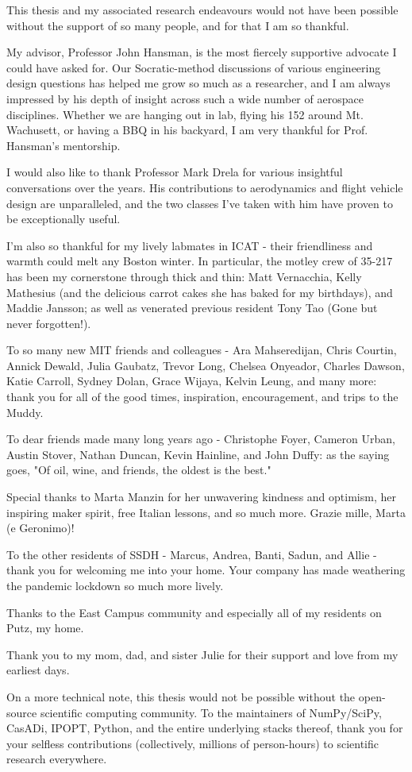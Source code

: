 This thesis and my associated research endeavours would not have been possible without the support of so many people, and for that I am so thankful.

My advisor, Professor John Hansman, is the most fiercely supportive advocate I could have asked for. Our Socratic-method discussions of various engineering design questions has helped me grow so much as a researcher, and I am always impressed by his depth of insight across such a wide number of aerospace disciplines. Whether we are hanging out in lab, flying his 152 around Mt. Wachusett, or having a BBQ in his backyard, I am very thankful for Prof. Hansman's mentorship.

I would also like to thank Professor Mark Drela for various insightful conversations over the years. His contributions to aerodynamics and flight vehicle design are unparalleled, and the two classes I've taken with him have proven to be exceptionally useful.

I'm also so thankful for my lively labmates in ICAT - their friendliness and warmth could melt any Boston winter. In particular, the motley crew of 35-217 has been my cornerstone through thick and thin: Matt Vernacchia, Kelly Mathesius (and the delicious carrot cakes she has baked for my birthdays), and Maddie Jansson; as well as venerated previous resident Tony Tao (Gone but never forgotten!).

To so many new MIT friends and colleagues - Ara Mahseredijan, Chris Courtin, Annick Dewald, Julia Gaubatz, Trevor Long, Chelsea Onyeador, Charles Dawson, Katie Carroll, Sydney Dolan, Grace Wijaya, Kelvin Leung, and many more: thank you for all of the good times, inspiration, encouragement, and trips to the Muddy.

To dear friends made many long years ago - Christophe Foyer, Cameron Urban, Austin Stover, Nathan Duncan, Kevin Hainline, and John Duffy: as the saying goes, "Of oil, wine, and friends, the oldest is the best."

Special thanks to Marta Manzin for her unwavering kindness and optimism, her inspiring maker spirit, free Italian lessons, and so much more. Grazie mille, Marta (e Geronimo)!

To the other residents of SSDH - Marcus, Andrea, Banti, Sadun, and Allie - thank you for welcoming me into your home. Your company has made weathering the pandemic lockdown so much more lively.

Thanks to the East Campus community and especially all of my residents on Putz, my home.

Thank you to my mom, dad, and sister Julie for their support and love from my earliest days. %

On a more technical note, this thesis would not be possible without the open-source scientific computing community. To the maintainers of NumPy/SciPy, CasADi, IPOPT, Python, and the entire underlying stacks thereof, thank you for your selfless contributions (collectively, millions of person-hours) to scientific research everywhere.



